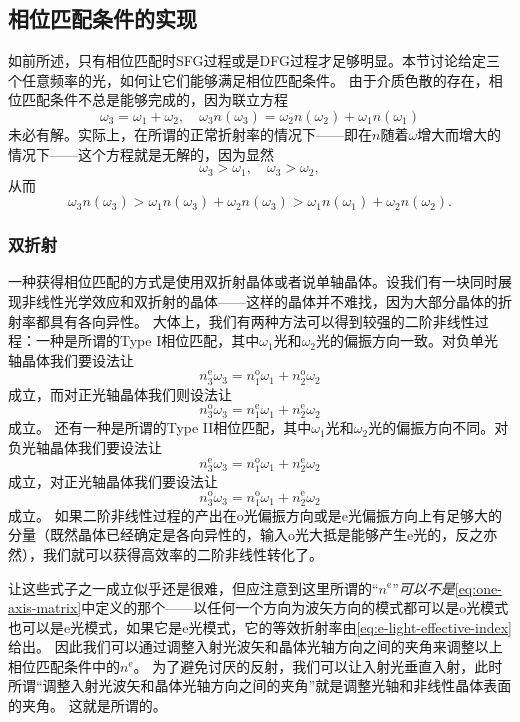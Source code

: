 \subsection{相位匹配条件的实现}

如前所述，只有相位匹配时SFG过程或是DFG过程才足够明显。本节讨论给定三个任意频率的光，如何让它们能够满足相位匹配条件。
由于介质色散的存在，相位匹配条件不总是能够完成的，因为联立方程
\[
    \omega_3 = \omega_1 + \omega_2, \quad \omega_3 n(\omega_3) = \omega_2 n(\omega_2) + \omega_1 n(\omega_1)
\]
未必有解。实际上，在所谓的正常折射率的情况下——即在$n$随着$\omega$增大而增大的情况下——这个方程就是无解的，因为显然
\[
    \omega_3 > \omega_1, \quad \omega_3 > \omega_2,
\]
从而
\[
    \omega_3 n(\omega_3) > \omega_1 n(\omega_3) + \omega_2 n(\omega_3) > \omega_1 n(\omega_1) + \omega_2 n(\omega_2).
\]

\subsubsection{双折射}

一种获得相位匹配的方式是使用双折射晶体或者说单轴晶体。设我们有一块同时展现非线性光学效应和双折射的晶体——这样的晶体并不难找，因为大部分晶体的折射率都具有各向异性。
大体上，我们有两种方法可以得到较强的二阶非线性过程：一种是所谓的Type I相位匹配，其中$\omega_1$光和$\omega_2$光的偏振方向一致。对负单光轴晶体我们要设法让
\begin{equation}
    n^\text{e}_3 \omega_3 = n^\text{o}_1 \omega_1 + n^\text{o}_2 \omega_2
\end{equation}
成立，而对正光轴晶体我们则设法让
\begin{equation}
    n^\text{o}_3 \omega_3 = n^\text{e}_1 \omega_1 + n^\text{e}_2 \omega_2
\end{equation}
成立。
还有一种是所谓的Type II相位匹配，其中$\omega_1$光和$\omega_2$光的偏振方向不同。对负光轴晶体我们要设法让
\begin{equation}
    n^\text{e}_3 \omega_3 = n^\text{o}_1 \omega_1 + n^\text{e}_2 \omega_2
\end{equation}
成立，对正光轴晶体我们要设法让
\begin{equation}
    n^\text{o}_3 \omega_3 = n^\text{o}_1 \omega_1 + n^\text{e}_2 \omega_2
\end{equation}
成立。
如果二阶非线性过程的产出在o光偏振方向或是e光偏振方向上有足够大的分量（既然晶体已经确定是各向异性的，输入o光大抵是能够产生e光的，反之亦然），我们就可以获得高效率的二阶非线性转化了。

让这些式子之一成立似乎还是很难，但应注意到这里所谓的“$n^\text{e}$”\emph{可以不是}\eqref{eq:one-axis-matrix}中定义的那个——以任何一个方向为波矢方向的模式都可以是o光模式也可以是e光模式，如果它是e光模式，它的等效折射率由\eqref{eq:e-light-effective-index}给出。
因此我们可以通过调整入射光波矢和晶体光轴方向之间的夹角来调整以上相位匹配条件中的$n^\text{e}$。
为了避免讨厌的反射，我们可以让入射光垂直入射，此时所谓“调整入射光波矢和晶体光轴方向之间的夹角”就是调整光轴和非线性晶体表面的夹角。
这就是所谓的。


